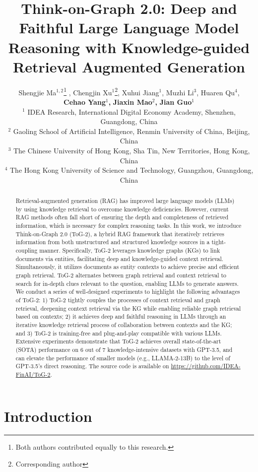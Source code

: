 \documentclass{article} %
\title{Think-on-Graph 2.0: Deep and Faithful Large Language Model Reasoning with Knowledge-guided Retrieval Augmented Generation}
\author{Shengjie Ma$^{1,2}$\thanks{Both authors contributed equally to this research.} , Chengjin Xu$^{1}$\footnotemark[1] \thanks{Corresponding author}, Xuhui Jiang$^{1}$\footnotemark[1], Muzhi Li$^{3}$, Huaren Qu$^{4}$, \\ \textbf{Cehao Yang}$^{1}$\textbf{,} \textbf{Jiaxin Mao}$^{2}$\footnotemark[2]\textbf{,} \textbf{Jian Guo}$^{1}$\footnotemark[2] \\
$^1$ IDEA Research, International Digital Economy Academy, Shenzhen, Guangdong, China \\
$^2$ Gaoling School of Artificial Intelligence, Renmin University of China, Beijing, China \\
$^3$ The Chinese University of Hong Kong, Sha Tin, New Territories, Hong Kong, China \\
$^4$ The Hong Kong University of Science and Technology, Guangzhou, Guangdong, China \\}
\begin{document}
\maketitle
\begin{abstract}
Retrieval-augmented generation (RAG) has improved large language models (LLMs) by using knowledge retrieval to overcome knowledge deficiencies. However, current RAG methods often fall short of ensuring the depth and completeness of retrieved information, which is necessary for complex reasoning tasks. In this work, we introduce Think-on-Graph 2.0 (ToG-2), a hybrid RAG framework that iteratively retrieves information from both unstructured and structured knowledge sources in a tight-coupling manner. Specifically, ToG-2 leverages knowledge graphs (KGs) to link documents via entities, facilitating deep and knowledge-guided context retrieval. Simultaneously, it utilizes documents as entity contexts to achieve precise and efficient graph retrieval. 
ToG-2 alternates between graph retrieval and context retrieval to search for in-depth clues relevant to the question, enabling LLMs to generate answers.
We conduct a series of well-designed experiments to highlight the following advantages of ToG-2: 1) ToG-2 tightly couples the processes of context retrieval and graph retrieval, deepening context retrieval via the KG while enabling reliable graph retrieval based on contexts; 2) it achieves deep and faithful reasoning in LLMs through an iterative knowledge retrieval process of collaboration between contexts and the KG; and 3) ToG-2 is training-free and plug-and-play compatible with various LLMs. Extensive experiments demonstrate that ToG-2 achieves overall state-of-the-art (SOTA) performance on 6 out of 7 knowledge-intensive datasets with GPT-3.5, and can elevate the performance of smaller models (e.g., LLAMA-2-13B) to the level of GPT-3.5’s direct reasoning. The source code is available on \url{https://github.com/IDEA-FinAI/ToG-2}.
\end{abstract}

\section{Introduction}
\end{document}
